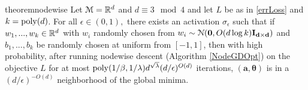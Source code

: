 \begin{restatable}{theorem}{nodewise}\label{nodeWise}
Let $\mathcal{M} = {\mathbb{R}}^{d}$ and $d \equiv 3 \mod 4$ and let $L$ be as in \ref{errLoss} and $k = \mathrm{poly}(d)$. For all $\epsilon \in (0,1),$ there exists an activation $\sigma_\epsilon$ such that if $w_1,...,w_k \in {\mathbb{R}}^d$ with $w_i$ randomly chosen from $w_i \sim  \mathcal{N}({\bf 0}, O(d\log k){\bf I_{d\times d}})$ and $b_1,...,b_k$ be randomly chosen at uniform from $[-1,1]$, then with high probability, after running nodewise descent (Algorithm \ref{NodeGDOpt}) on the objective $L$ for at most $\mathrm{poly}(1/\beta,1/\lambda)d^{\sqrt{\lambda}}(d/\epsilon)^{O(d)}$ iterations, $\boldsymbol{(a,\theta)}$ is in a $(d/\epsilon)^{-O(d)}$ neighborhood of the global minima.
\end{restatable}

%

